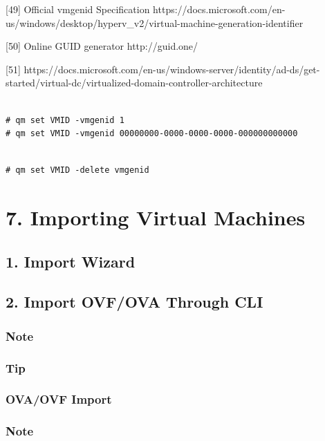 [49] Official vmgenid Specification https://docs.microsoft.com/en-us/windows/desktop/hyperv_v2/virtual-machine-generation-identifier

[50] Online GUID generator http://guid.one/

[51] https://docs.microsoft.com/en-us/windows-server/identity/ad-ds/get-started/virtual-dc/virtualized-domain-controller-architecture

\begin{lstlisting}

# qm set VMID -vmgenid 1
# qm set VMID -vmgenid 00000000-0000-0000-0000-000000000000

\end{lstlisting}

\begin{lstlisting}

# qm set VMID -delete vmgenid

\end{lstlisting}


\section{7. Importing Virtual Machines}

\subsection{1. Import Wizard}

\subsection{2. Import OVF/OVA Through CLI}

\subsubsection{Note}

\subsubsection{Tip}

\subsubsection{OVA/OVF Import}

\subsubsection{Note}

